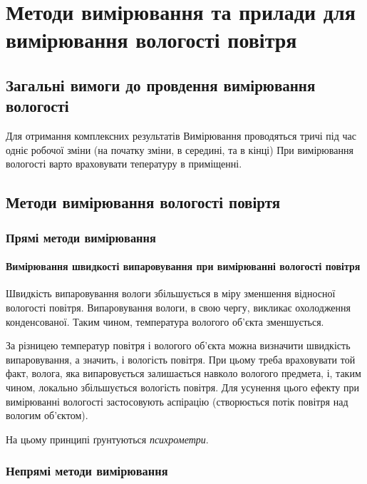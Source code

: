 \chapter{Методи вимірювання та прилади для вимірювання вологості повітря}

\section{Загальні вимоги до провдення  вимірювання вологості}

Для отримання комплексних результатів Вимірювання проводяться тричі під час одніє робочої зміни (на
початку зміни, в середині, та в кінці) При вимірювання вологості варто враховувати тепературу в
приміщенні.

\section{Методи вимірювання вологості повіртя}

\subsection{Прямі методи вимірювання}

\subsubsection{Вимірювання швидкості випаровування при вимірюванні вологості повітря}

Швидкість випаровування вологи збільшується в міру зменшення відносної вологості повітря.
Випаровування вологи, в свою чергу, викликає охолодження конденсованої. Таким чином, температура
вологого об'єкта зменшується.

За різницею температур повітря і вологого об'єкта можна визначити
швидкість випаровування, а значить, і вологість повітря. При цьому треба враховувати той факт,
волога, яка випаровується залишається навколо вологого предмета, і, таким чином, локально
збільшується вологість повітря. Для усунення цього ефекту при вимірюванні вологості застосовують
аспірацію (створюється потік повітря над вологим об'єктом).

На цьому принципі ґрунтуються \textit{психрометри}.

\subsection{Непрямі методи вимірювання}

